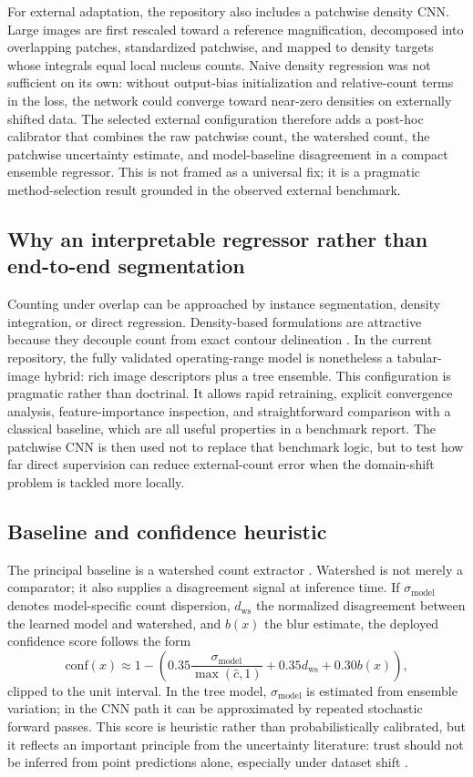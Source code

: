 \documentclass[10pt,a4paper,twocolumn]{article}
\begin{document}
For external adaptation, the repository also includes a patchwise density CNN. Large images are first rescaled toward a reference magnification, decomposed into overlapping patches, standardized patchwise, and mapped to density targets whose integrals equal local nucleus counts. Naive density regression was not sufficient on its own: without output-bias initialization and relative-count terms in the loss, the network could converge toward near-zero densities on externally shifted data. The selected external configuration therefore adds a post-hoc calibrator that combines the raw patchwise count, the watershed count, the patchwise uncertainty estimate, and model-baseline disagreement in a compact ensemble regressor. This is not framed as a universal fix; it is a pragmatic method-selection result grounded in the observed external benchmark.

\subsection{Why an interpretable regressor rather than end-to-end segmentation}
Counting under overlap can be approached by instance segmentation, density integration, or direct regression. Density-based formulations are attractive because they decouple count from exact contour delineation \cite{lempitsky}. In the current repository, the fully validated operating-range model is nonetheless a tabular-image hybrid: rich image descriptors plus a tree ensemble. This configuration is pragmatic rather than doctrinal. It allows rapid retraining, explicit convergence analysis, feature-importance inspection, and straightforward comparison with a classical baseline, which are all useful properties in a benchmark report. The patchwise CNN is then used not to replace that benchmark logic, but to test how far direct supervision can reduce external-count error when the domain-shift problem is tackled more locally.

\subsection{Baseline and confidence heuristic}
The principal baseline is a watershed count extractor \cite{watershed}. Watershed is not merely a comparator; it also supplies a disagreement signal at inference time. If $\sigma_{\text{model}}$ denotes model-specific count dispersion, $d_{\text{ws}}$ the normalized disagreement between the learned model and watershed, and $b(x)$ the blur estimate, the deployed confidence score follows the form
\begin{equation}
\mathrm{conf}(x)\approx 1-\left(0.35\frac{\sigma_{\text{model}}}{\max(\hat{c},1)}+0.35d_{\text{ws}}+0.30b(x)\right),
\end{equation}
clipped to the unit interval. In the tree model, $\sigma_{\text{model}}$ is estimated from ensemble variation; in the CNN path it can be approximated by repeated stochastic forward passes. This score is heuristic rather than probabilistically calibrated, but it reflects an important principle from the uncertainty literature: trust should not be inferred from point predictions alone, especially under dataset shift \cite{ovadia}.
\end{document}

